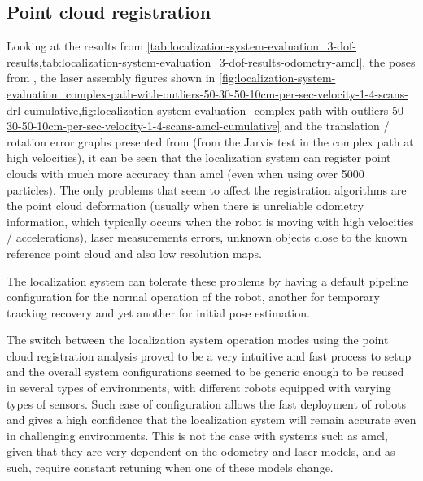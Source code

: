 \subsection{Point cloud registration}

Looking at the results from \cref{tab:localization-system-evaluation_3-dof-results,tab:localization-system-evaluation_3-dof-results-odometry-amcl}, the poses from , the laser assembly figures shown in \cref{fig:localization-system-evaluation_complex-path-with-outliers-50-30-50-10cm-per-sec-velocity-1-4-scans-drl-cumulative,fig:localization-system-evaluation_complex-path-with-outliers-50-30-50-10cm-per-sec-velocity-1-4-scans-amcl-cumulative} and the translation / rotation error graphs presented from  (from the Jarvis test in the complex path at high velocities), it can be seen that the localization system can register point clouds with much more accuracy than \gls{amcl} (even when using over 5000 particles). The only problems that seem to affect the registration algorithms are the point cloud deformation (usually when there is unreliable odometry information, which typically occurs when the robot is moving with high velocities / accelerations), laser measurements errors, unknown objects close to the known reference point cloud and also low resolution maps.

The localization system can tolerate these problems by having a default pipeline configuration for the normal operation of the robot, another for temporary tracking recovery and yet another for initial pose estimation.

The switch between the localization system operation modes using the point cloud registration analysis proved to be a very intuitive and fast process to setup and the overall system configurations seemed to be generic enough to be reused in several types of environments, with different robots equipped with varying types of sensors. Such ease of configuration allows the fast deployment of robots and gives a high confidence that the localization system will remain accurate even in challenging environments. This is not the case with systems such as \gls{amcl}, given that they are very dependent on the odometry and laser models, and as such, require constant retuning when one of these models change.

